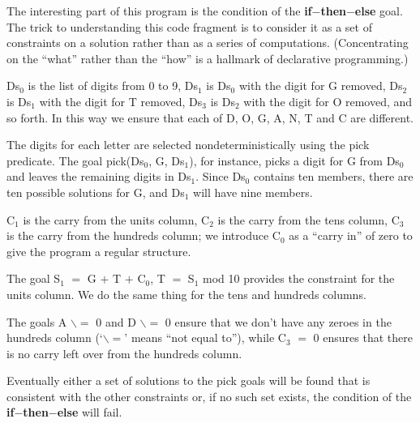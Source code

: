 \documentclass[a4paper,11pt,notitlepage,onecolumn]{book}
\begin{document}
The interesting part of this program is the condition of the \textsf{\textbf{if}{\ensuremath{-}}\textbf{then}{\ensuremath{-}}\textbf{else}}
goal.  The trick to understanding this code fragment is to consider it as a
set of constraints on a solution rather than as a series of computations.
(Concentrating on the ``what'' rather than the ``how'' is a hallmark of
declarative programming.)

\textsf{Ds$_{0}$} is the list of digits from 0 to 9, \textsf{Ds$_{1}$} is \textsf{Ds$_{0}$} with the digit for
\textsf{G} removed, \textsf{Ds$_{2}$} is \textsf{Ds$_{1}$} with the digit for \textsf{T} removed, \textsf{Ds$_{3}$} is \textsf{Ds$_{2}$}
with the digit for \textsf{O} removed, and so forth.  In this way we ensure that
each of \textsf{D}, \textsf{O}, \textsf{G}, \textsf{A}, \textsf{N}, \textsf{T} and \textsf{C} are different.

The digits for each letter are selected nondeterministically using the
\textsf{pick} predicate.  The goal \textsf{pick(Ds$_{0}$, G, Ds$_{1}$)}, for instance, picks a digit
for \textsf{G} from \textsf{Ds$_{0}$} and leaves the remaining digits in \textsf{Ds$_{1}$}.  Since \textsf{Ds$_{0}$}
contains ten members, there are ten possible solutions for \textsf{G}, and \textsf{Ds$_{1}$}
will have nine members.

\textsf{C$_{1}$} is the carry from the units column, \textsf{C$_{2}$} is the carry 
from the tens column, \textsf{C$_{3}$} is the carry from the hundreds column; we
introduce \textsf{C$_{0}$} as a ``carry in'' of zero to give the program a regular
structure.

The goal
\textsf{S$_{1}$ {\ensuremath{=}} G {\ensuremath{+}} T {\ensuremath{+}} C$_{0}$, T {\ensuremath{=}} S$_{1}$ mod 10} provides the constraint for the units
column.  We do the same thing for the tens and hundreds columns.

The goals \textsf{A {\ensuremath{\backslash}}{\ensuremath{=}} 0} and \textsf{D {\ensuremath{\backslash}}{\ensuremath{=}} 0} ensure that we don't have any zeroes in the
hundreds column (`\textsf{{\ensuremath{\backslash}}{\ensuremath{=}}}' means ``not equal to''), while \textsf{C$_{3}$ {\ensuremath{=}} 0} ensures that
there is no carry left over from the hundreds column.

Eventually either a set of solutions to the \textsf{pick} goals will be found that
is consistent with the other constraints or, if no such set exists, 
the condition of the \textsf{\textbf{if}{\ensuremath{-}}\textbf{then}{\ensuremath{-}}\textbf{else}} will fail.
\end{document}
